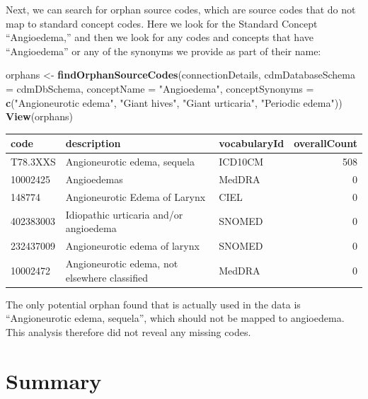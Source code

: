 \documentclass[11pt]{book}
\newenvironment{Shaded}{\begin{snugshade}}{\end{snugshade}}
\newcommand{\KeywordTok}[1]{\textcolor[rgb]{0.13,0.29,0.53}{\textbf{#1}}}
\newcommand{\DataTypeTok}[1]{\textcolor[rgb]{0.13,0.29,0.53}{#1}}
\newcommand{\StringTok}[1]{\textcolor[rgb]{0.31,0.60,0.02}{#1}}
\newcommand{\NormalTok}[1]{#1}
\theoremstyle{definition}
\theoremstyle{definition}
\theoremstyle{definition}
\theoremstyle{remark}
\begin{document}
Next, we can search for orphan source codes, which are source codes that
do not map to standard concept codes. Here we look for the Standard
Concept ``Angioedema,'' and then we look for any codes and concepts that
have ``Angioedema'' or any of the synonyms we provide as part of their
name:

\begin{Shaded}
\begin{Highlighting}[]
\NormalTok{orphans <-}\StringTok{ }\KeywordTok{findOrphanSourceCodes}\NormalTok{(connectionDetails,}
                                 \DataTypeTok{cdmDatabaseSchema =}\NormalTok{ cdmDbSchema,}
                                 \DataTypeTok{conceptName =} \StringTok{"Angioedema"}\NormalTok{,}
                                 \DataTypeTok{conceptSynonyms =} \KeywordTok{c}\NormalTok{(}\StringTok{"Angioneurotic edema"}\NormalTok{,}
                                                     \StringTok{"Giant hives"}\NormalTok{,}
                                                     \StringTok{"Giant urticaria"}\NormalTok{,}
                                                     \StringTok{"Periodic edema"}\NormalTok{))}
\KeywordTok{View}\NormalTok{(orphans)}
\end{Highlighting}
\end{Shaded}

\begin{longtable}[]{@{}lllr@{}}
\toprule
code & description & vocabularyId & overallCount\tabularnewline
\midrule
\endhead
T78.3XXS & Angioneurotic edema, sequela & ICD10CM & 508\tabularnewline
10002425 & Angioedemas & MedDRA & 0\tabularnewline
148774 & Angioneurotic Edema of Larynx & CIEL & 0\tabularnewline
402383003 & Idiopathic urticaria and/or angioedema & SNOMED &
0\tabularnewline
232437009 & Angioneurotic edema of larynx & SNOMED & 0\tabularnewline
10002472 & Angioneurotic edema, not elsewhere classified & MedDRA &
0\tabularnewline
\bottomrule
\end{longtable}

The only potential orphan found that is actually used in the data is
``Angioneurotic edema, sequela'', which should not be mapped to
angioedema. This analysis therefore did not reveal any missing codes.

\section{Summary}\label{summary-9}
\end{document}
